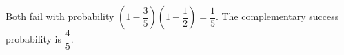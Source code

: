Both fail with probability $(1-\dfrac{3}{5})(1-\dfrac{1}{2})=\dfrac{1}{5}$. The complementary success probability is $\boxed{\dfrac{4}{5}}$.
